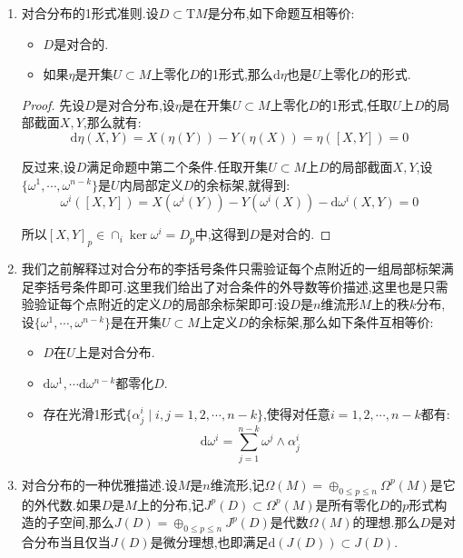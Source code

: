 \begin{enumerate}
\begin{proof}
    	其中$I$取遍单调递增的复指标,而$I'=(i_2,\cdots,i_p)$.这个表示对每个$U_p,p\in U$都可构造.选取$\{U_p\}$的单位分解$\{\psi_p\}$,把这些表示乘以$\psi_p$相加得到$\eta$在$U$上具有该表示.
    \end{proof}
    \item 对合分布的1形式准则.设$D\subset\mathrm{T}M$是分布,如下命题互相等价:
    \begin{itemize}
    	\item $D$是对合的.
    	\item 如果$\eta$是开集$U\subset M$上零化$D$的1形式,那么$\mathrm{d}\eta$也是$U$上零化$D$的形式.
    \end{itemize}
    \begin{proof}
    	
    	先设$D$是对合分布,设$\eta$是在开集$U\subset M$上零化$D$的1形式,任取$U$上$D$的局部截面$X,Y$,那么就有:$$\mathrm{d}\eta(X,Y)=X(\eta(Y))-Y(\eta(X))=\eta([X,Y])=0$$
    	
    	反过来,设$D$满足命题中第二个条件.任取开集$U\subset M$上$D$的局部截面$X,Y$,设$\{\omega^1,\cdots,\omega^{n-k}\}$是$U$内局部定义$D$的余标架,就得到:
    	$$\omega^i([X,Y])=X(\omega^i(Y))-Y(\omega^i(X))-\mathrm{d}\omega^i(X,Y)=0$$
    	
    	所以$[X,Y]_p\in\cap_i\ker\omega^i=D_p$中,这得到$D$是对合的.
    \end{proof}
    \item 我们之前解释过对合分布的李括号条件只需验证每个点附近的一组局部标架满足李括号条件即可.这里我们给出了对合条件的外导数等价描述,这里也是只需验验证每个点附近的定义$D$的局部余标架即可:设$D$是$n$维流形$M$上的秩$k$分布,设$\{\omega^1,\cdots,\omega^{n-k}\}$是在开集$U\subset M$上定义$D$的余标架,那么如下条件互相等价:
    \begin{itemize}
    	\item $D$在$U$上是对合分布.
    	\item $\mathrm{d}\omega^1,\cdots\mathrm{d}\omega^{n-k}$都零化$D$.
    	\item 存在光滑1形式$\{\alpha_j^i\mid i,j=1,2,\cdots,n-k\}$,使得对任意$i=1,2,\cdots,n-k$都有:
    	$$\mathrm{d}\omega^i=\sum_{j=1}^{n-k}\omega^j\wedge\alpha_j^i$$
    \end{itemize}
    \item 对合分布的一种优雅描述.设$M$是$n$维流形,记$\Omega(M)=\oplus_{0\le p\le n}\Omega^p(M)$是它的外代数.如果$D$是$M$上的分布,记$J^p(D)\subset\Omega^p(M)$是所有零化$D$的$p$形式构造的子空间,那么$J(D)=\oplus_{0\le p\le n}J^p(D)$是代数$\Omega(M)$的理想.那么$D$是对合分布当且仅当$J(D)$是微分理想,也即满足$\mathrm{d}(J(D))\subset J(D)$.
\end{enumerate}

